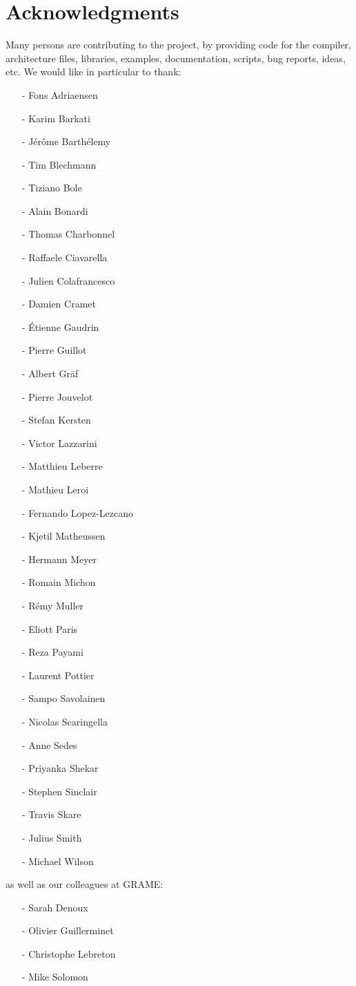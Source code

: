 \chapter{Acknowledgments}
Many persons are contributing to the \faust project, by providing code for the compiler, architecture files, libraries, examples, documentation, scripts, bug reports, ideas, etc. We would like in particular to thank:

\begin{itemize}
\item[-]Fons Adriaensen	
\item[-]Karim Barkati
\item[-]J\'er\^ome Barth\'elemy
\item[-]Tim Blechmann
\item[-]Tiziano Bole	
\item[-]Alain Bonardi
\item[-]Thomas Charbonnel
\item[-]Raffaele Ciavarella
\item[-]Julien Colafrancesco
\item[-]Damien Cramet
\item[-]\'Etienne Gaudrin
\item[-]Pierre Guillot
\item[-]Albert Gr\"af
\item[-]Pierre Jouvelot
\item[-]Stefan Kersten
\item[-]Victor Lazzarini
\item[-]Matthieu Leberre
\item[-]Mathieu Leroi
\item[-]Fernando Lopez-Lezcano
\item[-]Kjetil Matheussen
\item[-]Hermann Meyer
\item[-]Romain Michon
\item[-]R\'emy Muller
\item[-]Eliott Paris
\item[-]Reza Payami
\item[-]Laurent Pottier
\item[-]Sampo Savolainen
\item[-]Nicolas Scaringella
\item[-]Anne Sedes
\item[-]Priyanka Shekar
\item[-]Stephen Sinclair
\item[-]Travis Skare
\item[-]Julius Smith
\item[-]Michael Wilson
\end{itemize}
as well as our colleagues at GRAME:
\begin{itemize}
\item[-]	Sarah Denoux
\item[-]	Olivier Guillerminet
\item[-]	Christophe Lebreton
\item[-]	Mike Solomon
\end{itemize}


